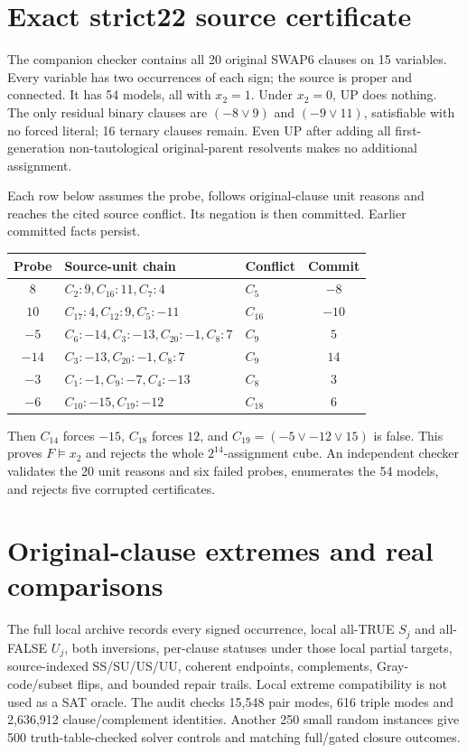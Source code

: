 \documentclass[11pt]{article}
\begin{document}
\section{Exact strict22 source certificate}
The companion checker contains all 20 original SWAP6 clauses on 15 variables. Every variable has two occurrences of each sign; the source is proper and connected. It has 54 models, all with $x_2=1$. Under $x_2=0$, UP does nothing. The only residual binary clauses are $(-8\vee9)$ and $(-9\vee11)$, satisfiable with no forced literal; 16 ternary clauses remain. Even UP after adding all first-generation non-tautological original-parent resolvents makes no additional assignment.

Each row below assumes the probe, follows original-clause unit reasons and reaches the cited source conflict. Its negation is then committed. Earlier committed facts persist.
\begin{center}\small
\begin{tabular}{cllc}
\toprule Probe&Source-unit chain&Conflict&Commit\\\midrule
$8$&$C_2:9,C_{16}:11,C_7:4$&$C_5$&$-8$\\
$10$&$C_{17}:4,C_{12}:9,C_5:-11$&$C_{16}$&$-10$\\
$-5$&$C_6:-14,C_3:-13,C_{20}:-1,C_8:7$&$C_9$&$5$\\
$-14$&$C_3:-13,C_{20}:-1,C_8:7$&$C_9$&$14$\\
$-3$&$C_1:-1,C_9:-7,C_4:-13$&$C_8$&$3$\\
$-6$&$C_{10}:-15,C_{19}:-12$&$C_{18}$&$6$\\\bottomrule
\end{tabular}
\end{center}
Then $C_{14}$ forces $-15$, $C_{18}$ forces $12$, and $C_{19}=(-5\vee-12\vee15)$ is false. This proves $F\models x_2$ and rejects the whole $2^{14}$-assignment cube. An independent checker validates the 20 unit reasons and six failed probes, enumerates the 54 models, and rejects five corrupted certificates.

\section{Original-clause extremes and real comparisons}
The full local archive records every signed occurrence, local all-TRUE $S_j$ and all-FALSE $U_j$, both inversions, per-clause statuses under those local partial targets, source-indexed SS/SU/US/UU, coherent endpoints, complements, Gray-code/subset flips, and bounded repair trails. Local extreme compatibility is not used as a SAT oracle. The audit checks 15,548 pair modes, 616 triple modes and 2,636,912 clause/complement identities. Another 250 small random instances give 500 truth-table-checked solver controls and matching full/gated closure outcomes.
\end{document}
